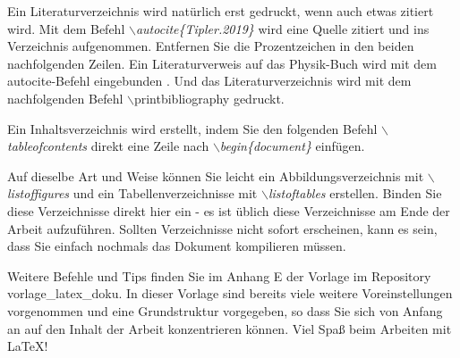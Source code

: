 \documentclass[ngerman,parskip]{scrbook}
\begin{document}
Ein Literaturverzeichnis wird natürlich erst gedruckt, wenn auch etwas zitiert
wird. Mit dem Befehl \textit{$\backslash$autocite\{Tipler.2019\}} wird eine
Quelle zitiert und ins Verzeichnis aufgenommen. Entfernen Sie die
Prozentzeichen in den beiden nachfolgenden Zeilen.
Ein Literaturverweis auf das Physik-Buch wird mit dem autocite-Befehl
eingebunden \autocite{Tipler.2019}. Und das Literaturverzeichnis wird mit dem
nachfolgenden Befehl $\backslash$printbibliography gedruckt.
\printbibliography

Ein Inhaltsverzeichnis wird erstellt, indem Sie den folgenden Befehl
\textit{$\backslash$tableofcontents} direkt eine Zeile nach
\textit{$\backslash$begin\{document\}} einfügen.

Auf dieselbe Art und Weise können Sie leicht ein Abbildungsverzeichnis mit
\textit{$\backslash$listoffigures} und ein Tabellenverzeichnisse mit
\textit{$\backslash$listoftables} erstellen. Binden Sie diese Verzeichnisse
direkt hier ein - es ist üblich diese Verzeichnisse am Ende der Arbeit
aufzuführen. Sollten Verzeichnisse nicht sofort erscheinen, kann es sein, dass
Sie einfach nochmals das Dokument kompilieren müssen.

\listoffigures

\listoftables

Weitere Befehle und Tips finden Sie im Anhang E der Vorlage im Repository \glqq
vorlage\_latex\_doku\grqq. In dieser Vorlage sind bereits viele weitere
Voreinstellungen vorgenommen und eine Grundstruktur vorgegeben, so dass Sie
sich von Anfang an auf den Inhalt der Arbeit konzentrieren können. Viel Spaß
beim Arbeiten mit \LaTeX!
\end{document}
